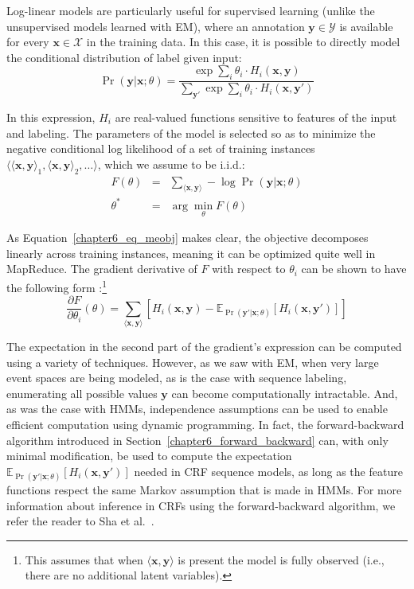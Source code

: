 Log-linear models are particularly useful for supervised learning
(unlike the unsupervised models learned with EM), where an annotation
$\textbf{y} \in \mathcal{Y}$ is available for every $\textbf{x} \in
\mathcal{X}$ in the training data.  In this case, it is possible to
directly model the conditional distribution of label given input:
\begin{equation}
\Pr(\textbf{y} | \textbf{x} ; \theta) = \frac{\exp \sum_i \theta_i \cdot H_i(\textbf{x}, \textbf{y})}{\sum_{\textbf{y}'}\exp \sum_i \theta_i \cdot H_i(\textbf{x}, \textbf{y}')}
\end{equation}

\noindent In this expression, $H_i$ are real-valued functions
sensitive to features of the input and labeling.  The parameters of
the model is selected so as to minimize the negative conditional log
likelihood of a set of training instances $\langle \langle \textbf{x}
, \textbf{y} \rangle_1 , \langle \textbf{x} , \textbf{y} \rangle_2 ,
\ldots \rangle$, which we assume to be i.i.d.:
\begin{eqnarray}
F(\theta) & = & \sum_{\langle \textbf{x} , \textbf{y} \rangle} - \log \Pr(\textbf{y} | \textbf{x} ; \theta) \label{chapter6_eq_meobj} \\
\theta^* & = & \arg \min_\theta F(\theta)
\end{eqnarray}

\noindent As Equation~\ref{chapter6_eq_meobj} makes clear, the
objective decomposes linearly across training instances, meaning it
can be optimized quite well in MapReduce.  The gradient derivative of
$F$ with respect to $\theta_i$ can be shown to have the following form
\cite{Smith_2004}:\footnote{This assumes that when $\langle
  \textbf{x}, \textbf{y} \rangle$ is present the model is fully
  observed (i.e., there are no additional latent variables).}
\begin{equation}
\frac{\partial F}{\partial \theta_i}(\theta) = \sum_{\langle \textbf{x} , \textbf{y} \rangle} \left[ H_i(\textbf{x},\textbf{y}) - \mathbb{E}_{\Pr(\textbf{y}' | \textbf{x} ; \theta)}[H_i(\textbf{x},\textbf{y}')] \right]
\end{equation}

\noindent The expectation in the second part of the gradient's
expression can be computed using a variety of techniques.  However, as
we saw with EM, when very large event spaces are being modeled, as is
the case with sequence labeling, enumerating all possible values
$\textbf{y}$ can become computationally intractable.  And, as was the
case with HMMs, independence assumptions can be used to enable
efficient computation using dynamic programming.  In fact, the
forward-backward algorithm introduced in
Section~\ref{chapter6_forward_backward} can, with only minimal
modification, be used to compute the expectation
$\mathbb{E}_{\Pr(\textbf{y}' | \textbf{x} ;
  \theta)}[H_i(\textbf{x},\textbf{y}')]$ needed in CRF sequence
models, as long as the feature functions respect the same Markov
assumption that is made in HMMs.  For more information about inference
in CRFs using the forward-backward algorithm, we refer the reader to
Sha et al.~\cite{Sha_2003}.

